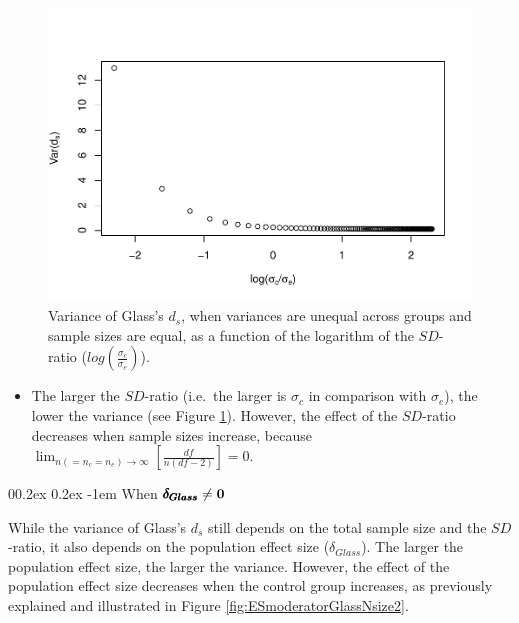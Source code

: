 \documentclass[
  english,
  man]{apa6}
\makeatletter
\providecommand{\tightlist}{%
  \setlength{\itemsep}{0pt}\setlength{\parskip}{0pt}}
\let\oldparagraph\paragraph
\renewcommand{\paragraph}[1]{\oldparagraph{#1}\mbox{}}
\renewcommand{\paragraph}{\@startsection{paragraph}{4}{\parindent}%
  {0\baselineskip \@plus 0.2ex \@minus 0.2ex}%
  {-1em}%
  {\normalfont\normalsize\bfseries\itshape\typesectitle}}
\makeatother
\begin{document}
\begin{figure}
\centering
\includegraphics{Theoretical-Variance-of-all-estimators-as-a-function-of-population-parameters_files/figure-latex/varglasshetbalSDratio2-1.pdf}
\caption{\label{fig:varglasshetbalSDratio2}Variance of Glass's \(d_s\), when variances are unequal across groups and sample sizes are equal, as a function of the logarithm of the \(SD\)-ratio (\(log \left( \frac{\sigma_c}{\sigma_e} \right)\)).}
\end{figure}

\begin{itemize}
\tightlist
\item
  The larger the \(SD\)-ratio (i.e.~the larger is \(\sigma_c\) in comparison with \(\sigma_e\)), the lower the variance (see Figure \ref{fig:varglasshetbalSDratio2}). However, the effect of the \(SD\)-ratio decreases when sample sizes increase, because \(\lim_{n(=n_c=n_e)\rightarrow \infty}\left[\frac{df}{n(df-2)} \right]=0\).
\end{itemize}

\hypertarget{when-bf-pmbdelta_glass-neq-0-1}{%
\paragraph{\texorpdfstring{When \(\bf \pmb{\delta_{Glass}} \neq 0\)}{When \textbackslash bf \textbackslash pmb\{\textbackslash delta\_\{Glass\}\} \textbackslash neq 0}}\label{when-bf-pmbdelta_glass-neq-0-1}}

While the variance of Glass's \(d_s\) still depends on the total sample size and the \(SD\)-ratio, it also depends on the population effect size (\(\delta_{Glass}\)). The larger the population effect size, the larger the variance. However, the effect of the population effect size decreases when the control group increases, as previously explained and illustrated in Figure \ref{fig:ESmoderatorGlassNsize2}.
\end{document}
